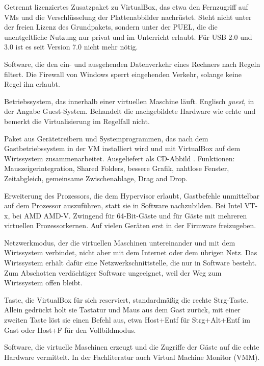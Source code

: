 \begin{glossar}
Getrennt lizenziertes Zusatzpaket zu VirtualBox, das etwa den Fernzugriff auf VMs und die Verschlüsselung der Plattenabbilder nachrüstet. Steht nicht unter der freien Lizenz des Grundpakets, sondern unter der PUEL, die die unentgeltliche Nutzung nur privat und im Unterricht erlaubt. Für USB 2.0 und 3.0 ist es seit Version 7.0 nicht mehr nötig.

Software, die den ein- und ausgehenden Datenverkehr eines Rechners nach Regeln filtert. Die Firewall von Windows sperrt eingehenden Verkehr, solange keine Regel ihn erlaubt.

Betriebssystem, das innerhalb einer virtuellen Maschine läuft. Englisch \emph{guest}, in der Angabe Guest-System. Behandelt die nachgebildete Hardware wie echte und bemerkt die Virtualisierung im Regelfall nicht.

Paket aus Gerätetreibern und Systemprogrammen, das nach dem Gastbetriebssystem in der VM installiert wird und mit VirtualBox auf dem Wirtssystem zusammenarbeitet. Ausgeliefert als CD-Abbild . Funktionen: Mauszeigerintegration, Shared Folders, bessere Grafik, nahtlose Fenster, Zeitabgleich, gemeinsame Zwischenablage, Drag and Drop.

Erweiterung des Prozessors, die dem Hypervisor erlaubt, Gastbefehle unmittelbar auf dem Prozessor auszuführen, statt sie in Software nachzubilden. Bei Intel VT-x, bei AMD AMD-V. Zwingend für 64-Bit-Gäste und für Gäste mit mehreren virtuellen Prozessorkernen. Auf vielen Geräten erst in der Firmware freizugeben.

Netzwerkmodus, der die virtuellen Maschinen untereinander und mit dem Wirtssystem verbindet, nicht aber mit dem Internet oder dem übrigen Netz. Das Wirtssystem erhält dafür eine Netzwerkschnittstelle, die nur in Software besteht. Zum Abschotten verdächtiger Software ungeeignet, weil der Weg zum Wirtssystem offen bleibt.

Taste, die VirtualBox für sich reserviert, standardmäßig die rechte Strg-Taste. Allein gedrückt holt sie Tastatur und Maus aus dem Gast zurück, mit einer zweiten Taste löst sie einen Befehl aus, etwa Host+Entf für Strg+Alt+Entf im Gast oder Host+F für den Vollbildmodus.

Software, die virtuelle Maschinen erzeugt und die Zugriffe der Gäste auf die echte Hardware vermittelt. In der Fachliteratur auch Virtual Machine Monitor (VMM).


\end{glossar}
